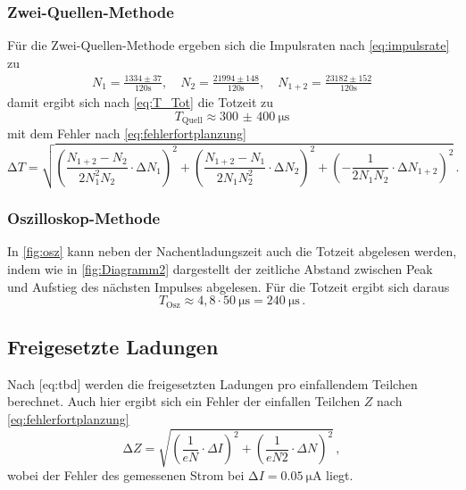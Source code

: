 \subsubsection*{Zwei-Quellen-Methode}

Für die Zwei-Quellen-Methode ergeben sich die Impulsraten nach \autoref{eq:impulsrate} zu
\begin{align*}
    N_{1}   =\frac{1334 \pm 37}{120 \mathrm{s}}, \quad 
    N_{2}   =\frac{21994 \pm 148}{120 \mathrm{s}}, \quad 
    N_{1+2} =\frac{23182 \pm 152}{120 \mathrm{s}}
\end{align*}
damit ergibt sich nach \autoref{eq:T_Tot} die Totzeit zu
\begin{equation}
    T_\text{Quell} \approx \qty{300(400)}{\micro\second}
\end{equation}
mit dem Fehler nach \autoref{eq:fehlerfortplanzung}
\begin{equation*}
    \increment T  = \sqrt{
      \left(\frac{N_{1+2}-N_{2}}{2 N_{1}^{2} N_{2}} \cdot \increment N_{1}\right)^{2} 
    + \left(\frac{N_{1+2}-N_{1}}{2 N_{1} N_{2}^{2}} \cdot \increment N_{2}\right)^{2} 
    + \left(-\frac{1}{2 N_{1} N_{2}} \cdot \increment N_{1+2}\right)^{2}
    } \, .
\end{equation*}

\subsubsection*{Oszilloskop-Methode}

In \autoref{fig:osz} kann neben der Nachentladungszeit auch die Totzeit abgelesen werden, 
indem wie in \autoref{fig:Diagramm2} dargestellt der zeitliche Abstand zwischen Peak und Aufstieg
des nächsten Impulses abgelesen. Für die Totzeit ergibt sich daraus
\begin{equation*}
    T_\text{Osz} \approx 4,8 \cdot \qty{50}{\micro\second} = \qty{240}{\micro\second} \, .
\end{equation*}


\subsection{Freigesetzte Ladungen}

Nach [eq:tbd] werden die freigesetzten Ladungen pro einfallendem Teilchen berechnet.
Auch hier ergibt sich ein Fehler der einfallen Teilchen $Z$ nach \autoref{eq:fehlerfortplanzung}
\begin{equation*}
    \increment Z 
    = \sqrt{\left(\frac{1}{e N} \cdot \Delta I\right)^{2}+\left(\frac{1}{e N 2} \cdot \Delta N\right)^{2}} \, ,
\end{equation*}
wobei der Fehler des gemessenen Strom bei $\increment I = \qty{0.05}{\micro\ampere}$ liegt.

